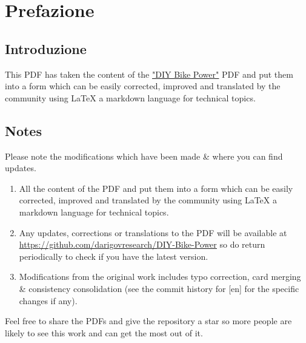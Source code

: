 \documentclass{article}
\theoremstyle{definition}
\theoremstyle{definition}
\theoremstyle{remark}
\begin{document}
\newpage

\tableofcontents

\newpage

{\color{blue}\section{Prefazione}} %
\label{sec:prefazione}

  \subsection*{Introduzione} %
  \label{sub:introduzione}
  
    This PDF has taken the content of the \href{https://www.demandenergyequality.org/build-your-own-bike-generators}{\underline{"DIY Bike Power"}} PDF and put them into a form which can be easily corrected, improved and translated by the community using LaTeX a markdown language for technical topics.


  \subsection*{Notes} %
  \label{sub:notes}

    Please note the modifications which have been made \& where you can find updates.

    \begin{enumerate}
      \item All the content of the PDF and put them into a form which can be easily corrected, improved and translated by the community using LaTeX a markdown language for technical topics.
      \item Any updates, corrections or translations to the PDF will be available at \href{https://github.com/darigovresearch/DIY-Bike-Power}{\underline{https://github.com/darigovresearch/DIY-Bike-Power}} so do return periodically to check if you have the latest version.
      \item Modifications from the original work includes typo correction, card merging \& consistency consolidation (see the commit history for [en] for the specific changes if any).
    \end{enumerate}

    Feel free to share the PDFs and give the repository a star so more people are likely to see this work and can get the most out of it.

\end{document}
